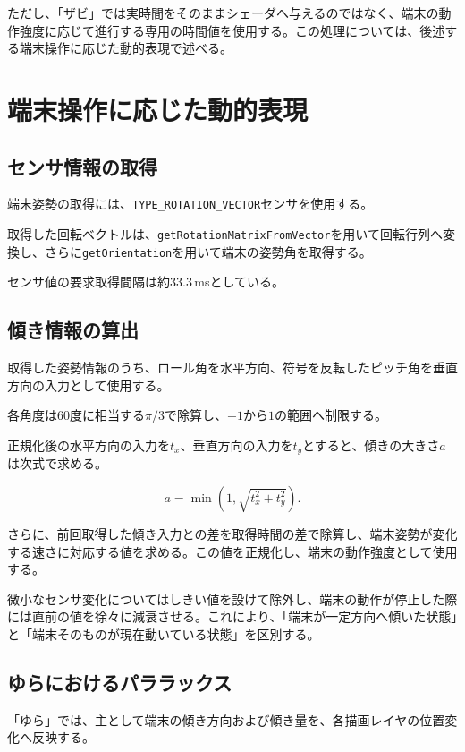 ただし、「ザビ」では実時間をそのままシェーダへ与えるのではなく、端末の動作強度に応じて進行する専用の時間値を使用する。この処理については、後述する端末操作に応じた動的表現で述べる。


\section{端末操作に応じた動的表現}

\subsection{センサ情報の取得}

端末姿勢の取得には、\texttt{TYPE\_ROTATION\_VECTOR}センサを使用する。

取得した回転ベクトルは、\texttt{getRotationMatrixFromVector}を用いて回転行列へ変換し、さらに\texttt{getOrientation}を用いて端末の姿勢角を取得する。

センサ値の要求取得間隔は約33.3\,msとしている。


\subsection{傾き情報の算出}

取得した姿勢情報のうち、ロール角を水平方向、符号を反転したピッチ角を垂直方向の入力として使用する。

各角度は60度に相当する$\pi/3$で除算し、$-1$から$1$の範囲へ制限する。

正規化後の水平方向の入力を\(t_x\)、垂直方向の入力を\(t_y\)とすると、傾きの大きさ\(a\)は次式で求める。

\begin{equation}
a=
\min
\left(
1,
\sqrt{t_x^2+t_y^2}
\right).
\end{equation}

さらに、前回取得した傾き入力との差を取得時間の差で除算し、端末姿勢が変化する速さに対応する値を求める。この値を正規化し、端末の動作強度として使用する。

微小なセンサ変化についてはしきい値を設けて除外し、端末の動作が停止した際には直前の値を徐々に減衰させる。これにより、「端末が一定方向へ傾いた状態」と「端末そのものが現在動いている状態」を区別する。


\subsection{ゆらにおけるパララックス}

「ゆら」では、主として端末の傾き方向および傾き量を、各描画レイヤの位置変化へ反映する。

